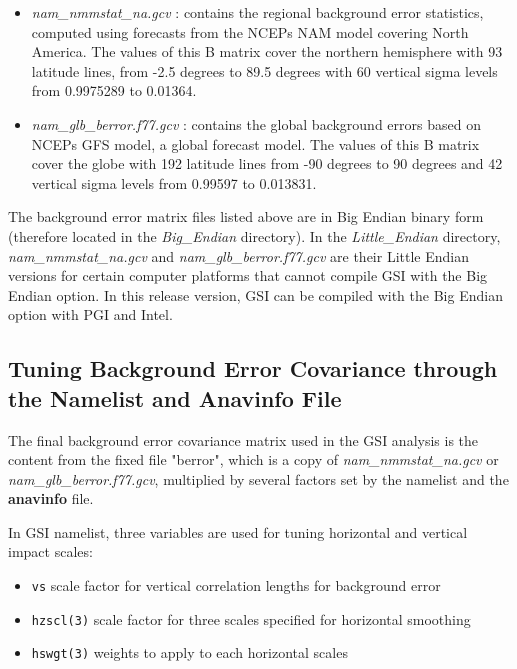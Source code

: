 \begin{itemize}
\item \textit{nam\_nmmstat\_na.gcv} : contains the regional background error statistics, computed using forecasts from the NCEP\textquotesingle s NAM model covering North America. The values of this B matrix cover the northern hemisphere with 93 latitude lines, from -2.5 degrees to 89.5 degrees with 60 vertical sigma levels from 0.9975289 to 0.01364. 
\item \textit{nam\_glb\_berror.f77.gcv} : contains the global background errors based on NCEP\textquotesingle s GFS model, a global forecast model. The values of this B matrix cover the globe with 192 latitude lines from -90 degrees to 90 degrees and 42 vertical sigma levels from 0.99597 to 0.013831.
\end{itemize}

The background error matrix files listed above are in Big Endian binary form (therefore located in the \textit{Big\_Endian} directory). In the \textit{Little\_Endian} directory, \textit{nam\_nmmstat\_na.gcv} and \textit{nam\_glb\_berror.f77.gcv} are their Little Endian versions for certain computer platforms that cannot compile GSI with the Big Endian option. In this release version, GSI can be compiled with the Big Endian option with PGI and Intel.

\subsection{Tuning Background Error Covariance through the Namelist and Anavinfo File}

The final background error covariance matrix used in the GSI analysis is the content from the fixed file "berror", which is a copy of \textit{nam\_nmmstat\_na.gcv} or \textit{nam\_glb\_berror.f77.gcv}, multiplied by several factors set by the namelist and the \textbf{anavinfo} file.

In GSI namelist, three variables are used for tuning horizontal and vertical impact scales:

\begin{itemize}
\item \verb|vs|	scale factor for vertical correlation lengths for background error
\item \verb|hzscl(3)| scale factor for three scales specified for horizontal smoothing 
\item \verb|hswgt(3)| weights to apply to each horizontal scales
\end{itemize}

